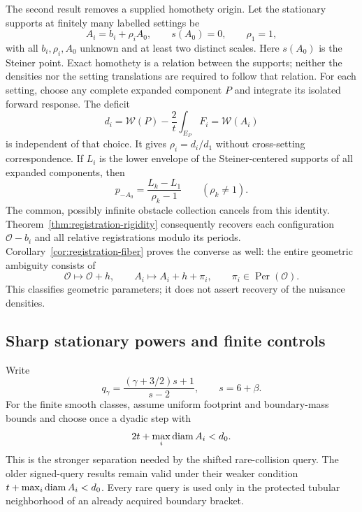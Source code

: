 The second result removes a supplied homothety origin. Let the
stationary supports at finitely many labelled settings be
\[
 A_i=b_i+\rho_i A_0,\qquad s(A_0)=0,\qquad \rho_1=1,
\]
with all $b_i,\rho_i,A_0$ unknown and at least two distinct scales.
Here $s(A_0)$ is the Steiner point. Exact homothety is a relation
between the supports; neither the densities nor the setting translations
are required to follow that relation. For each setting, choose any
complete expanded component $P$ and integrate its isolated forward
response. The deficit
\begin{equation}\label{eq:intro-footprint-deficit}
 d_i=\mathcal W(P)-\frac2t\int_{E_P}F_i
                         =\mathcal W(A_i)
\end{equation}
is independent of that choice. It gives $\rho_i=d_i/d_1$ without
cross-setting correspondence. If $L_i$ is the lower envelope of the
Steiner-centered supports of all expanded components, then
\begin{equation}\label{eq:intro-unregistered-inverse}
 p_{-A_0}=\frac{L_k-L_1}{\rho_k-1}\qquad(\rho_k\ne1).
\end{equation}
The common, possibly infinite obstacle collection cancels from this
identity. Theorem~\ref{thm:registration-rigidity} consequently recovers
each configuration $\mathcal O-b_i$ and all relative registrations
modulo its periods. Corollary~\ref{cor:registration-fiber} proves the
converse as well: the entire geometric ambiguity consists of
\[
 \mathcal O\longmapsto\mathcal O+h,\qquad
 A_i\longmapsto A_i+h+\pi_i,\qquad
                  \pi_i\in\operatorname{Per}(\mathcal O).
\]
This classifies geometric parameters; it does not assert recovery of
the nuisance densities.

\subsection{Sharp stationary powers and finite controls}
Write
\[
 q_\gamma=\frac{(\gamma+3/2)s+1}{s-2},\qquad s=6+\beta.
\]
For the finite smooth classes, assume uniform footprint and
boundary-mass bounds and choose once a dyadic step with
\begin{equation}\label{eq:intro-rare-design}
                     2t+\max_i\operatorname{diam} A_i<d_0.
\end{equation}
This is the stronger separation needed by the shifted rare-collision
query. The older signed-query results remain valid under their weaker
condition $t+\max_i\operatorname{diam} A_i<d_0$. Every rare query is used only in
the protected tubular neighborhood of an already acquired boundary
bracket.

